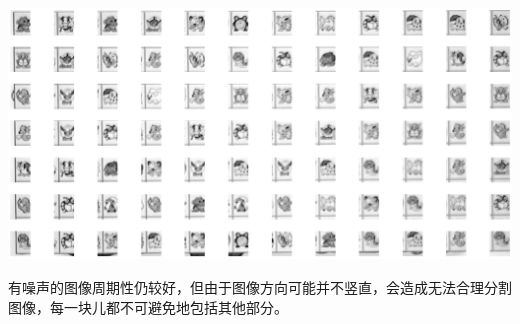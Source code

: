 \subsection{}
\noindent{}
\par \begin{center}\includegraphics[width=\textwidth]{A4_2_2.eps}\end{center} 有噪声的图像周期性仍较好，但由于图像方向可能并不竖直，会造成无法合理分割图像，每一块儿都不可避免地包括其他部分。

